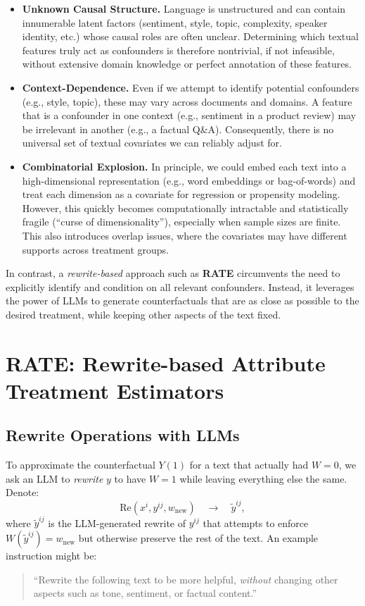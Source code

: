 \begin{itemize}
    \item \textbf{Unknown Causal Structure.} Language is unstructured and can contain innumerable latent factors (sentiment, style, topic, complexity, speaker identity, etc.) whose causal roles are often unclear. Determining which textual features truly act as confounders is therefore nontrivial, if not infeasible, without extensive domain knowledge or perfect annotation of these features.

    \item \textbf{Context-Dependence.} Even if we attempt to identify potential confounders (e.g., style, topic), these may vary across documents and domains. A feature that is a confounder in one context (e.g., sentiment in a product review) may be irrelevant in another (e.g., a factual Q\&A). Consequently, there is no universal set of textual covariates we can reliably adjust for.

    \item \textbf{Combinatorial Explosion.} In principle, we could embed each text into a high-dimensional representation (e.g., word embeddings or bag-of-words) and treat each dimension as a covariate for regression or propensity modeling. However, this quickly becomes computationally intractable and statistically fragile (``curse of dimensionality''), especially when sample sizes are finite. This also introduces overlap issues, where the covariates may have different supports across treatment groups.

\end{itemize}

In contrast, a \emph{rewrite-based} approach such as \textbf{RATE} circumvents the need to explicitly identify and condition on all relevant confounders. Instead, it leverages the power of LLMs to generate counterfactuals that are as close as possible to the desired treatment, while keeping other aspects of the text fixed.

\section{RATE: Rewrite-based Attribute Treatment Estimators}
\label{sec:rate}

\subsection{Rewrite Operations with LLMs}
To approximate the counterfactual $Y(1)$ for a text that actually had $W=0$, we ask an LLM to \emph{rewrite} $y$ to have $W=1$ while leaving everything else the same. Denote:
\[
\text{Re}(x^i, y^{ij}, w_{\text{new}}) \quad\longrightarrow\quad \tilde{y}^{ij},
\]
where $\tilde{y}^{ij}$ is the LLM-generated rewrite of $y^{ij}$ that attempts to enforce $W(\tilde{y}^{ij}) = w_{\text{new}}$ but otherwise preserve the rest of the text. An example instruction might be:
\begin{quote}
``Rewrite the following text to be more helpful, \textit{without} changing other aspects such as tone, sentiment, or factual content.''
\end{quote}


